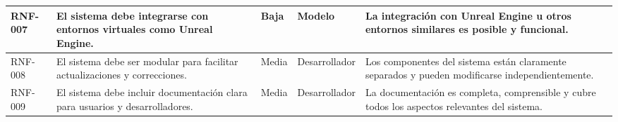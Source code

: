 \begin{table}[H]
\begin{adjustbox}{width=\textwidth}
\begin{tabular}{p{1.2cm}p{5cm}p{1.75cm}p{2.25cm}p{5cm}}
    \hline %
    RNF-007 & El sistema debe integrarse con entornos virtuales como Unreal Engine. & Baja & Modelo & La integración con Unreal Engine u otros entornos similares es posible y funcional. \\
    \hline %
    RNF-008 & El sistema debe ser modular para facilitar actualizaciones y correcciones. & Media & Desarrollador & Los componentes del sistema están claramente separados y pueden modificarse independientemente. \\
    \hline %
    RNF-009 & El sistema debe incluir documentación clara para usuarios y desarrolladores. & Media & Desarrollador & La documentación es completa, comprensible y cubre todos los aspectos relevantes del sistema. \\
    \hline %
    \end{tabular}
    \end{adjustbox}
    \end{table}